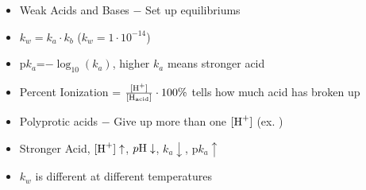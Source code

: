 \documentclass[12pt]{article}
\begin{document}
\begin{itemize}
\item Weak Acids and Bases $-$ Set up equilibriums

\item $k_w=k_a \cdot k_b$ ($k_w=1\cdot10^{-14}$)

\item p$k_a$=$-\log_{10}(k_a)$, higher $k_a$ means stronger acid

\item Percent Ionization = $\frac{[\ce{H+}]}{[\ce{H}_{\text{acid}}]}\cdot 100\%$ tells how much acid has broken up

\item Polyprotic acids $-$ Give up more than one $[\ce{H+}]$ (ex. )

\item Stronger Acid, $[\ce{H+}]\uparrow$, $p\ce{H}\downarrow$, $k_a\downarrow$, p$k_a\uparrow$

\item $k_w$ is different at different temperatures

\end{itemize}
\end{document}
